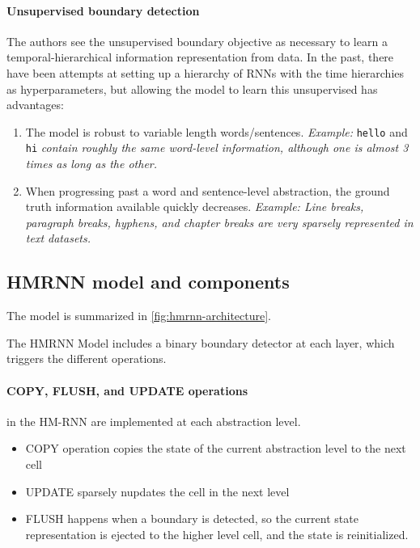 \paragraph{Unsupervised boundary detection}
The authors see the unsupervised boundary objective as necessary to learn a temporal-hierarchical information representation from data.
In the past, there have been attempts at setting up a hierarchy of RNNs with the time hierarchies as hyperparameters, 
but allowing the model to learn this unsupervised has advantages:
\begin{enumerate}
    \item The model is robust to variable length words/sentences. 
    \textit{Example:} \texttt{hello} and \texttt{hi} \textit{contain roughly the same word-level information, 
    although one is almost 3 times as long as the other.}
    \item When progressing past a word and sentence-level abstraction, the ground truth information available quickly decreases.
    \textit{Example: Line breaks, paragraph breaks, hyphens, and chapter breaks are very sparsely represented in text datasets.}
\end{enumerate}




\subsection{HMRNN model and components}
The model is summarized in \cref{fig:hmrnn-architecture}.

The HMRNN Model includes a binary boundary detector at each layer, which triggers the different operations. 

\paragraph{COPY, FLUSH, and UPDATE operations} in the HM-RNN are implemented at each abstraction level.

\begin{itemize}
    \item COPY operation copies the state of the current abstraction level to the next cell
    \item UPDATE sparsely nupdates the cell in the next level 
    \item FLUSH happens when a boundary is detected, 
    so the current state representation is ejected to the higher level cell, and the state is reinitialized.
\end{itemize}


